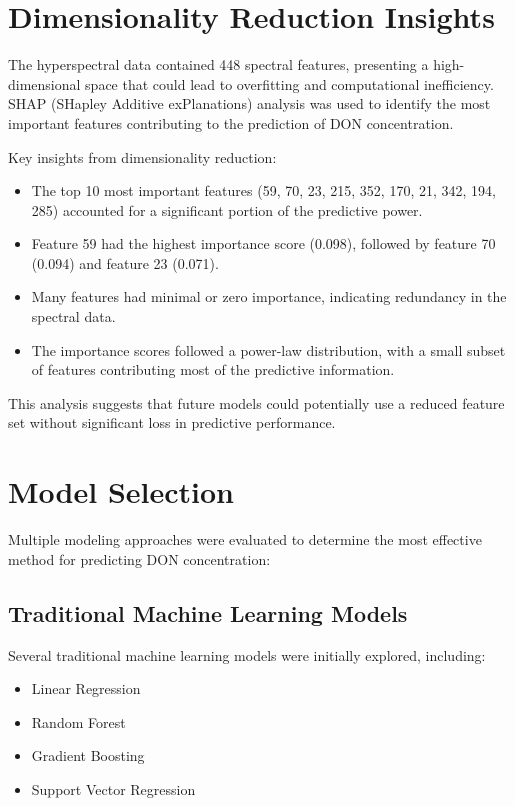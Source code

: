 \documentclass{article}
\begin{document}
\section{Dimensionality Reduction Insights}
The hyperspectral data contained 448 spectral features, presenting a high-dimensional space that could lead to overfitting and computational inefficiency. SHAP (SHapley Additive exPlanations) analysis was used to identify the most important features contributing to the prediction of DON concentration.

Key insights from dimensionality reduction:

\begin{itemize}
    \item The top 10 most important features (59, 70, 23, 215, 352, 170, 21, 342, 194, 285) accounted for a significant portion of the predictive power.
    
    \item Feature 59 had the highest importance score (0.098), followed by feature 70 (0.094) and feature 23 (0.071).
    
    \item Many features had minimal or zero importance, indicating redundancy in the spectral data.
    
    \item The importance scores followed a power-law distribution, with a small subset of features contributing most of the predictive information.
\end{itemize}

This analysis suggests that future models could potentially use a reduced feature set without significant loss in predictive performance.

\section{Model Selection}
Multiple modeling approaches were evaluated to determine the most effective method for predicting DON concentration:

\subsection{Traditional Machine Learning Models}
Several traditional machine learning models were initially explored, including:
\begin{itemize}
    \item Linear Regression
    \item Random Forest
    \item Gradient Boosting
    \item Support Vector Regression
\end{itemize}
\end{document}
